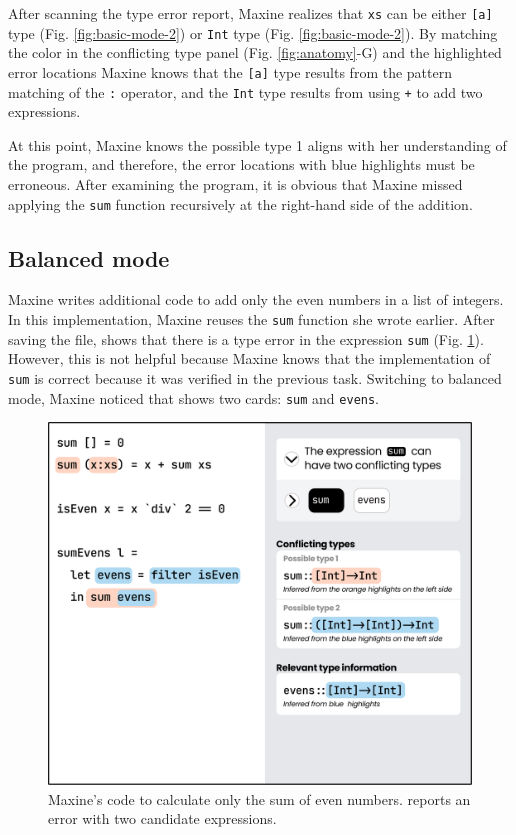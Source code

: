 After scanning the type error report, Maxine realizes that \texttt{xs} can be
either \texttt{[a]} type (Fig. \ref{fig:basic-mode-2}) or \texttt{Int} type (Fig. \ref{fig:basic-mode-2}). By matching the color in the
conflicting type panel (Fig. \ref{fig:anatomy}-G) and the highlighted error locations 
Maxine knows that the \texttt{[a]} type results from the pattern matching of the
\texttt{:} operator, and the \texttt{Int} type results from using \texttt{+} to
 add two expressions. 


At this point, Maxine knows the possible type 1 aligns with her understanding of
the program, and therefore, the error locations with blue highlights must be
erroneous. After examining the program, it is obvious that Maxine missed
applying the \texttt{sum} function recursively at the right-hand side of the
addition. 


\subsection{Balanced mode} \label{sub:balanced}


Maxine writes additional code to add only the even numbers in a list of integers.
In this implementation, Maxine reuses the \texttt{sum} function she wrote
earlier. After saving the file, \chameleon{} shows that there is a type error in the
expression \texttt{sum} (Fig. \ref{fig:balance-mode-1}). However, this is not 
helpful because Maxine knows that the implementation of  \texttt{sum} is correct 
because it was verified in the previous task. Switching to
balanced mode, Maxine noticed that \chameleon{} shows two cards: \texttt{sum}
and \texttt{evens}. 

\begin{figure}
        \centering
        \includegraphics[width=\linewidth]{images/balanced-mode-1.pdf}
        \caption{
            Maxine's code to calculate only the sum 
            of even numbers. \chameleon{} reports 
            an error with two candidate expressions.
        }
        \label{fig:balance-mode-1}
\end{figure}


